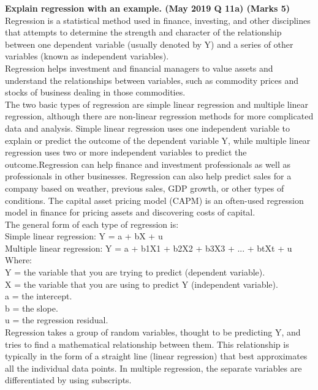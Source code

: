 
\textbf{\textcolor{LightMagenta}{Explain regression with an example. (May 2019 Q 11a) \hfill (Marks 5)}} \\[5pt]


Regression is a statistical method used in finance, investing, and other disciplines that attempts to determine the strength and character of the relationship between one dependent variable (usually denoted by Y) and a series of other variables (known as independent variables).\\
Regression helps investment and financial managers to value assets and understand the relationships between variables, such as commodity prices and stocks of business dealing in those commodities.\\
The two basic types of regression are simple linear regression and multiple linear regression, although there are non-linear regression methods for more complicated data and analysis. Simple linear regression uses one independent variable to explain or predict the outcome of the dependent variable Y, while multiple linear regression uses two or more independent variables to predict the outcome.Regression can help finance and investment professionals as well as professionals in other businesses. Regression can also help predict sales for a company based on weather, previous sales, GDP growth, or other types of conditions. The capital asset pricing model (CAPM) is an often-used regression model in finance for pricing assets and discovering costs of capital.\\

The general form of each type of regression is:\\
Simple linear regression: Y = a + bX + u\\
Multiple linear regression: Y = a + b1X1 + b2X2 + b3X3 + ... + btXt + u\\
Where:\\
Y = the variable that you are trying to predict (dependent variable).\\
X = the variable that you are using to predict Y (independent variable).\\
a = the intercept.\\
b = the slope.\\
u = the regression residual.\\

Regression takes a group of random variables, thought to be predicting Y, and tries to find a mathematical relationship between them. This relationship is typically in the form of a straight line (linear regression) that best approximates all the individual data points. In multiple regression, the separate variables are differentiated by using subscripts.\\

